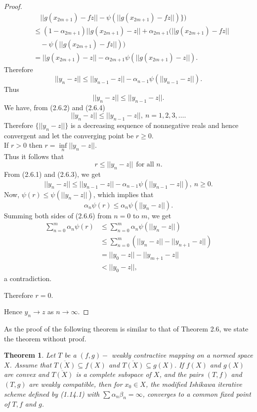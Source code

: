 \documentclass[11]{article}
\newtheorem{theorem}[definition]{Theorem}
\numberwithin{equation}{definition}
\begin{document}
\begin{proof}
\begin{align}
&\quad ||g(x_{2m+1})-fz||-\psi(||g(x_{2m+1})-fz||)\}) \nonumber \\
&\leq (1-\alpha_{2m+1})||g(x_{2m+1})-z||+\alpha_{2m+1}(||g(x_{2m+1})-fz|| \nonumber \\
&\quad -\psi(||g(x_{2m+1})-fz||)) \nonumber \\
&= ||g(x_{2m+1})-z||-\alpha_{2m+1}\psi(||g(x_{2m+1})-z||). \nonumber
\end{align}
Therefore
\begin{equation}
||y_{n}-z||\leq||y_{n-1}-z||-\alpha_{n-1}\psi(||y_{n-1}-z||).
\end{equation}
Thus
\begin{equation}
||y_{n}-z||\leq||y_{n-1}-z||.
\end{equation}
We have, from (2.6.2) and (2.6.4)
\[
||y_{n}-z||\leq||y_{n-1}-z||,\ n=1,2,3,\ldots.
\]
Therefore $\{||y_{n}-z||\}$ is a decreasing sequence of nonnegative reals and hence convergent and let the converging point be $r\geq 0$.\\
If $r>0$ then $r=\inf\limits_{n}||y_{n}-z||$.\\
Thus it follows that
\[
r\leq||y_{n}-z||\ \ \text{for all } n.
\]
From (2.6.1) and (2.6.3), we get
\begin{equation}
||y_{n}-z||\leq||y_{n-1}-z||-\alpha_{n-1}\psi(||y_{n-1}-z||),\ n\geq 0.
\end{equation}
Now,
$\psi(r)\leq\psi(||y_{n}-z||)$, which implies that
\begin{equation}
\alpha_{n}\psi(r)\leq\alpha_{n}\psi(||y_{n}-z||).
\end{equation}
Summing both sides of (2.6.6) from $n=0$ to $m$, we get
\begin{align*}
\sum_{n=0}^{m}\alpha_{n}\psi(r) &\leq \sum_{n=0}^{m}\alpha_{n}\psi(||y_{n}-z||) \\
&\leq \sum_{n=0}^{m}(||y_{n}-z||-||y_{n+1}-z||) \\
&= ||y_{0}-z||-||y_{m+1}-z|| \\
&< ||y_{0}-z||,
\end{align*}
a contradiction.

Therefore $r=0$.

Hence $y_{n}\to z$ as $n\to\infty$.

\end{proof}

As the proof of the following theorem is similar to that of Theorem 2.6, we state the theorem without proof.

\begin{theorem}
Let $T$ be a $(f,g)-$ weakly contractive mapping on a normed space $X$. Assume that $\overline{T(X)}\subseteq f(X)$ and $\overline{T(X)}\subseteq g(X)$. If $f(X)$ and $g(X)$ are convex and $\overline{T(X)}$ is a complete subspace of $X$, and the pairs $(T,f)$ and $(T,g)$ are weakly compatible, then for $x_{0}\in X$, the modified Ishikawa iterative scheme defined by (1.14.1) with $\sum\alpha_{n}\beta_{n}=\infty$, converges to a common fixed point of $T,f$ and $g$.
\end{theorem}
\end{document}
